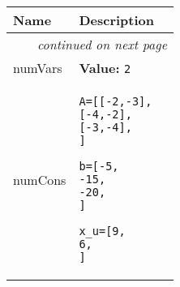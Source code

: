     \vspace{-1cm}
\hspace{\varindent}\begin{longtable}{|p{\varnamewidth}|p{\vardescrwidth}|l}
\cline{1-2}
\cline{1-2} \centering \textbf{Name} & \centering \textbf{Description}& \\
\cline{1-2}
\endhead\cline{1-2}\multicolumn{3}{r}{\small\textit{continued on next page}}\\\endfoot\cline{1-2}
\endlastfoot\raggedright n\-u\-m\-V\-a\-r\-s\- & \raggedright \textbf{Value:} 
{\tt 2}&\\
\cline{1-2}
\raggedright n\-u\-m\-C\-o\-n\-s\- & \raggedright \begin{alltt}

A = [[-2, -3], 
     [-4, -2], 
     [-3, -4],
     ]

b = [-5, 
     -15, 
     -20,
      ]

x\_u = [9,
       6,
       ]
\end{alltt}


\end{longtable}
